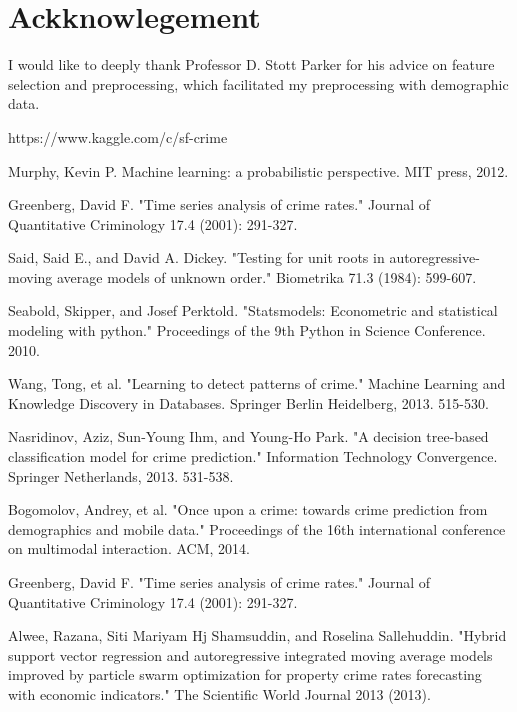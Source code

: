 \documentclass[11pt,conference]{IEEEtran}
\begin{document}
\section{Ackknowlegement}
I would like to deeply thank Professor D. Stott Parker for his advice on feature selection and preprocessing, which facilitated my preprocessing with demographic data.

\begin{thebibliography}{1}

https://www.kaggle.com/c/sf-crime

Murphy, Kevin P. Machine learning: a probabilistic perspective. MIT press, 2012.

Greenberg, David F. "Time series analysis of crime rates." Journal of Quantitative Criminology 17.4 (2001): 291-327.

Said, Said E., and David A. Dickey. "Testing for unit roots in autoregressive-moving average models of unknown order." Biometrika 71.3 (1984): 599-607.

Seabold, Skipper, and Josef Perktold. "Statsmodels: Econometric and statistical modeling with python." Proceedings of the 9th Python in Science Conference. 2010.

Wang, Tong, et al. "Learning to detect patterns of crime." Machine Learning and Knowledge Discovery in Databases. Springer Berlin Heidelberg, 2013. 515-530.

Nasridinov, Aziz, Sun-Young Ihm, and Young-Ho Park. "A decision tree-based classification model for crime prediction." Information Technology Convergence. Springer Netherlands, 2013. 531-538.

Bogomolov, Andrey, et al. "Once upon a crime: towards crime prediction from demographics and mobile data." Proceedings of the 16th international conference on multimodal interaction. ACM, 2014.

Greenberg, David F. "Time series analysis of crime rates." Journal of Quantitative Criminology 17.4 (2001): 291-327.

Alwee, Razana, Siti Mariyam Hj Shamsuddin, and Roselina Sallehuddin. "Hybrid support vector regression and autoregressive integrated moving average models improved by particle swarm optimization for property crime rates forecasting with economic indicators." The Scientific World Journal 2013 (2013).

\end{thebibliography}
\end{document}
